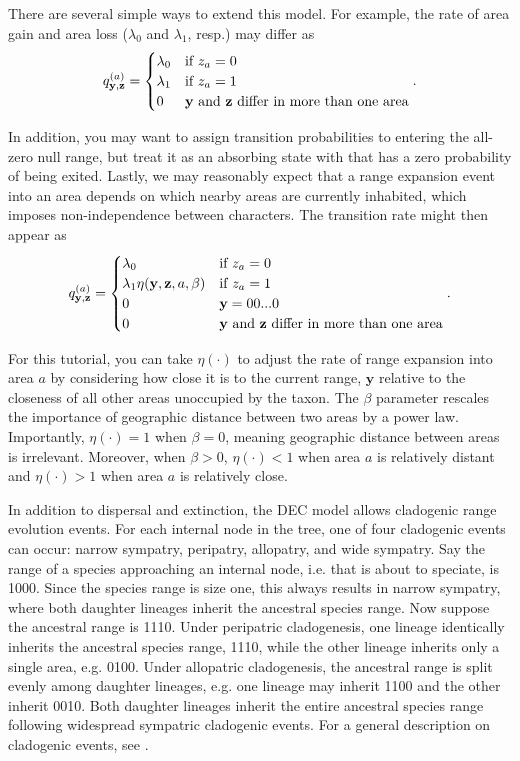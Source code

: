 \documentclass[11pt]{article}
\begin{document}
There are several simple ways to extend this model. For example, the rate of area gain and area loss ($\lambda_0$ and $\lambda_1$, resp.) may differ as
\[
q^{(a)}_{\textbf{y},\textbf{z}} =
\begin{cases}
\lambda_0 & \text{if $z_a=0$}  \\
\lambda_1 & \text{if $z_a=1$} \\
0 & \text{\textbf{y} and \textbf{z} differ in more than one area}
\end{cases}.
\]

In addition, you may want to assign transition probabilities to entering the all-zero null range, but treat it as an absorbing state with that has a zero probability of being exited. 
Lastly, we may reasonably expect that a range expansion event into an area depends on which nearby areas are currently inhabited, which imposes non-independence between characters.
The transition rate might then appear as
\[
q^{(a)}_{\textbf{y},\textbf{z}} =
\begin{cases}
\lambda_0 & \text{if $z_a=0$}  \\
\lambda_1 \eta(\textbf{y}, \textbf{z}, a, \beta) & \text{if $z_a=1$} \\
0 & \mathbf{y} = 00...0 \\
0 & \text{\textbf{y} and \textbf{z} differ in more than one area}
\end{cases}.
\]

For this tutorial, you can take $\eta(\cdot)$ to adjust the rate of range expansion into area $a$ by considering how close it is to the current range, $\textbf{y}$ relative to the closeness of all other areas unoccupied by the taxon.
The $\beta$ parameter rescales the importance of geographic distance between two areas by a power law.
Importantly, $\eta(\cdot) = 1$ when $\beta=0$, meaning geographic distance between areas is irrelevant.
Moreover, when $\beta > 0$, $\eta(\cdot) < 1$ when area $a$ is relatively distant and $\eta(\cdot) > 1$ when area $a$ is relatively close.

In addition to dispersal and extinction, the DEC model allows cladogenic range evolution events.
For each internal node in the tree, one of four cladogenic events can occur: narrow sympatry, peripatry, allopatry, and wide sympatry.
Say the range of a species approaching an internal node, i.e. that is about to speciate, is 1000.
Since the species range is size one, this always results in narrow sympatry, where both daughter lineages inherit the ancestral species range.
Now suppose the ancestral range is 1110.
Under peripatric cladogenesis, one lineage identically inherits the ancestral species range, 1110, while the other lineage inherits only a single area, e.g. 0100.
Under allopatric cladogenesis, the ancestral range is split evenly among daughter lineages, e.g. one lineage may inherit 1100 and the other inherit 0010.
Both daughter lineages inherit the entire ancestral species range following widespread sympatric cladogenic events.
For a general description on cladogenic events, see \citet{matzke14}.
\end{document}
